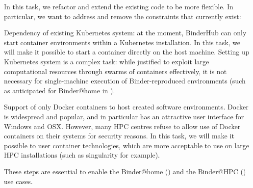 \begin{task}[
  title=Reducing technical constraints to enable broader usage,
  id=constraints,
  lead=SRL,
  PM=14,
  wphases={0-36},
  partners={MP,QS}
]

In this task, we refactor and extend the existing code to be more flexible. In
particular, we want to address and remove the constraints that currently exist:

\begin{compactitem}
\item Dependency of existing Kubernetes system: at the moment, BinderHub can
  only start container environments within a Kubernetes installation. In this
  task, we will make it possible to start a container directly on the host
  machine. Setting up Kubernetes system is a complex task: while justified to
  exploit large computational resources through swarms of containers
  effectively, it is not necessary for single-machine execution of
  Binder-reproduced environments (such as anticipated for Binder@home in
  ).
\item Support of only Docker containers to host created software environments.
  Docker is widespread and popular, and in particular has an attractive user
  interface for Windows and OSX. However, many HPC centres refuse to allow use
  of Docker containers on their systems for security reasons. In this task, we
  will make it possible to user container technologies, which are more
  acceptable to use on large HPC installations (such as singularity for
  example).
  \end{compactitem}

  These steps are essential to enable the Binder@home
  () and the Binder@HPC
  () use cases.

\end{task}
